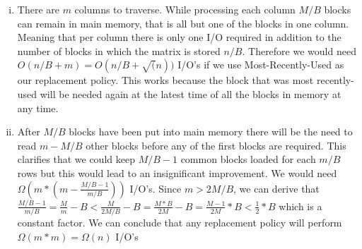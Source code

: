 \begin{enumerate}[(i)]
	\item
There are $m$ columns to traverse. While processing each column $M/B$ blocks can remain in main memory, that is all but one of the blocks in one column. Meaning that per column there is only one I/O required in addition to the number of blocks in which the matrix is stored $n/B$. Therefore we would need $O(n/B + m) = O(n/B + \sqrt(n))$ I/O's if we use Most-Recently-Used as our replacement policy. This works because the block that was most recently-used will be needed again at the latest time of all the blocks in memory at any time.

	\item
After $M/B$ blocks have been put into main memory there will be the need to read $m - M/B$ other blocks before any of the first blocks are required. This clarifies that we could keep $M/B-1$ common blocks loaded for each $m/B$ rows but this would lead to an insignificant improvement. We would need $\Omega(m * (m - \frac{M/B-1}{m/B}))$ I/O's. 
Since $m > 2M/B$, we can derive that $\frac{M/B-1}{m/B} = \frac{M}{m} - B < \frac{M}{2M/B} - B = \frac{M * B}{2M} - B = \frac{M-1}{2M} * B < \frac{1}{2}*B$ which is a constant factor.
We can conclude that any replacement policy will perform $\Omega(m * m) = \Omega(n)$ I/O's
\end{enumerate}
